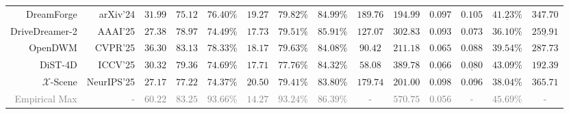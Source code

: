 \begin{table}[t]
{\begin{tabular}{r|r|cccccccc|cccc}
        \\
        DreamForge \cite{mei2024dreamforge} & {\small arXiv'24} & \underline{$31.99$} & $75.12$ & \underline{$76.40\%$} & $19.27$ & \cellcolor{w_blue!20}$\mathbf{79.82\%}$ & \underline{$84.99\%$} & $189.76$ & $194.99$ & $0.097$ & $0.105$ & $\underline{41.23\%}$ & $347.70$
        \\
        DriveDreamer-2 \cite{zhao2024drivedreamer-2} & {\small AAAI'25} & $27.38$ & $78.97$ & $74.49\%$ & \underline{$17.73$} & $79.51\%$ & \cellcolor{w_blue!20}$\mathbf{85.91\%}$ & $127.07$ & \underline{$302.83$} & $0.093$ & \cellcolor{w_yellow!20}$\mathbf{0.073}$ & $36.10\%$ & $\underline{259.91}$
        \\
        OpenDWM \cite{opendwm} & {\small CVPR'25} & \cellcolor{w_blue!20}$\mathbf{36.30}$ & \cellcolor{w_blue!20}$\mathbf{83.13}$ & \cellcolor{w_blue!20}$\mathbf{78.33\%}$ & $18.17$ & \underline{$79.63\%$} & $84.08\%$ & \underline{$90.42$} & $211.18$ & \cellcolor{w_yellow!20}$\mathbf{0.065}$ & $0.088$ & $39.54\%$ & $287.73$
        \\
        DiST-4D \cite{guo2025dist-4d} & {\small ICCV'25} & $30.32$ & \underline{$79.36$} & $74.69\%$ & \cellcolor{w_blue!20}$\mathbf{17.71}$ & $77.76\%$ & $84.32\%$ & \cellcolor{w_blue!20}$\mathbf{58.08}$ & \cellcolor{w_blue!20}$\mathbf{389.78}$ & $\underline{0.066}$ & $\underline{0.080}$ & \cellcolor{w_yellow!20}$\mathbf{43.09\%}$ & \cellcolor{w_yellow!20}$\mathbf{192.39}$
        \\
        $\mathcal{X}$-Scene \cite{yang2025x-scene} & {\small NeurIPS'25} & $27.17$ & $77.22$ & $74.37\%$ & $20.50$ & $79.41\%$ & $83.80\%$ & $179.74$ & $201.00$ & $0.098$ & $0.096$ & $38.04\%$ & $365.71$
        \\
        \midrule
        \rowcolor{gray!7}\textcolor{gray}{Empirical Max} & \textcolor{gray}{-} & \textcolor{gray}{$60.22$} & \textcolor{gray}{$83.25$} & \textcolor{gray}{$93.66\%$} & \textcolor{gray}{$14.27$} & \textcolor{gray}{$93.24\%$} & \textcolor{gray}{$86.39\%$} & \textcolor{gray}{-} & \textcolor{gray}{$570.75$} & \textcolor{gray}{0.056} & \textcolor{gray}{-} & \textcolor{gray}{$45.69\%$} & \textcolor{gray}{-}
        \\
        \bottomrule
    \end{tabular}}
\end{table}

